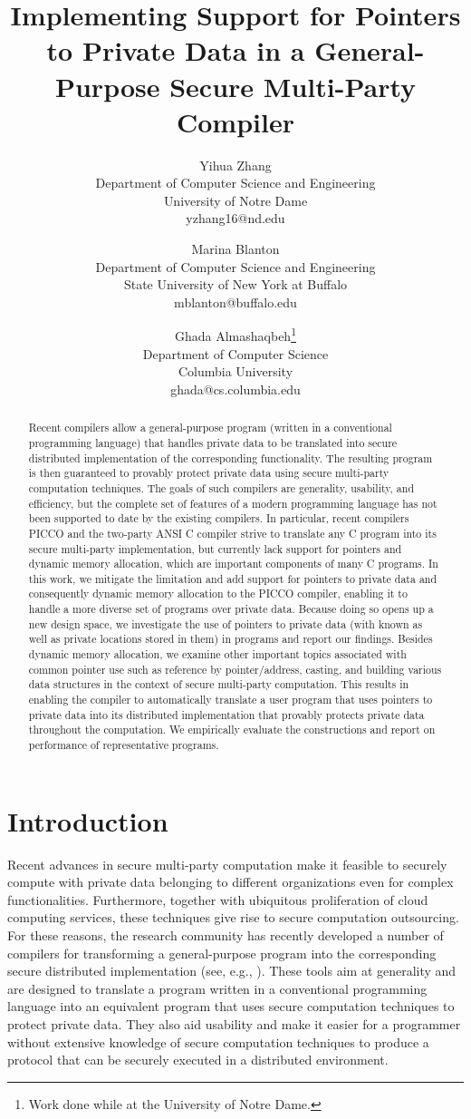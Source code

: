 \documentclass[11pt]{article}
\title{Implementing Support for Pointers to Private Data in a
  General-Purpose Secure Multi-Party Compiler}
\date{}
\author{Yihua Zhang\\
Department of Computer Science and Engineering\\
University of Notre Dame\\
yzhang16@nd.edu
\and Marina Blanton\\
Department of Computer Science and Engineering\\
State University of New York at Buffalo\\
mblanton@buffalo.edu
\and Ghada Almashaqbeh\footnote{Work done while at the University of Notre Dame.}\\
Department of Computer Science\\
Columbia University\\
ghada@cs.columbia.edu}
\begin{document}
\maketitle
\begin{abstract}
Recent compilers allow a general-purpose program (written in a
conventional programming language) that handles private data to be
translated into secure distributed implementation of the corresponding
functionality. The resulting program is then guaranteed to provably
protect private data using secure multi-party computation techniques.
The goals of such compilers are generality, usability, and efficiency,
but the complete set of features of a modern programming language has
not been supported to date by the existing compilers. In particular,
recent compilers PICCO and the two-party ANSI C compiler strive to
translate any C program into its secure multi-party implementation,
but currently lack support for pointers and dynamic memory allocation,
which are important components of many C programs. In this work, we
mitigate the limitation and add support for pointers to private data
and consequently dynamic memory allocation to the PICCO compiler,
enabling it to handle a more diverse set of programs over private
data. Because doing so opens up a new design space, we investigate the
use of pointers to private data (with known as well as private
locations stored in them) in programs and report our findings. Besides
dynamic memory allocation, we examine other important topics
associated with common pointer use such as reference by
pointer/address, casting, and building various data structures in the
context of secure multi-party computation. This results in enabling
the compiler to automatically translate a user program that uses
pointers to private data into its distributed implementation that
provably protects private data throughout the computation. We
empirically evaluate the constructions and report on performance of
representative programs.
\end{abstract}

\section{Introduction} 

Recent advances in secure multi-party computation make it feasible to
securely compute with private data belonging to different organizations even
for complex functionalities. Furthermore, together with ubiquitous
proliferation of cloud computing services, these techniques give rise to
secure computation outsourcing. For these reasons, the research community
has recently developed a number of compilers for transforming a
general-purpose program into the corresponding secure distributed
implementation (see, e.g., \cite{hol12,zha13}). These tools aim at
generality and are designed to translate a program written in a conventional
programming language into an equivalent program that uses secure computation
techniques to protect private data. They also aid usability and make it
easier for a programmer without extensive knowledge of secure computation
techniques to produce a protocol that can be securely executed in a
distributed environment.
\end{document}
